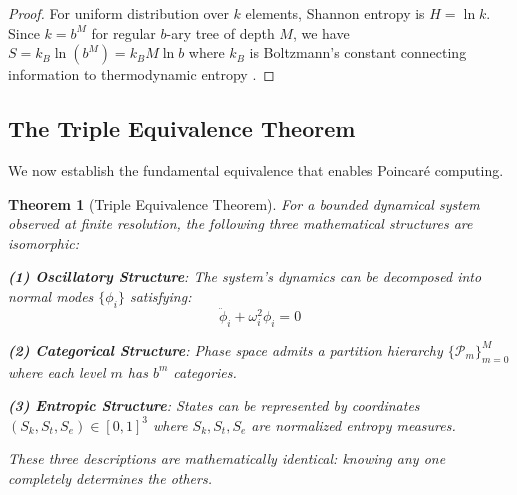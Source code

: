 \documentclass[twocolumn,10pt]{article}
\newtheorem{theorem}{Theorem}
\begin{document}
\begin{proof}
For uniform distribution over $k$ elements, Shannon entropy is $H = \ln k$. Since $k = b^M$ for regular $b$-ary tree of depth $M$, we have $S = k_B \ln(b^M) = k_B M \ln b$ where $k_B$ is Boltzmann's constant connecting information to thermodynamic entropy \cite{Shannon1948,Landauer1961}.
\end{proof}

\subsection{The Triple Equivalence Theorem}

We now establish the fundamental equivalence that enables Poincaré computing.

\begin{theorem}[Triple Equivalence Theorem]
\label{thm:triple_equivalence}
For a bounded dynamical system observed at finite resolution, the following three mathematical structures are isomorphic:

\textbf{(1) Oscillatory Structure}: The system's dynamics can be decomposed into normal modes $\{\phi_i\}$ satisfying:
\begin{equation}
\ddot{\phi}_i + \omega_i^2 \phi_i = 0
\end{equation}

\textbf{(2) Categorical Structure}: Phase space admits a partition hierarchy $\{\mathcal{P}_m\}_{m=0}^M$ where each level $m$ has $b^m$ categories.

\textbf{(3) Entropic Structure}: States can be represented by coordinates $(S_k, S_t, S_e) \in [0,1]^3$ where $S_k, S_t, S_e$ are normalized entropy measures.

These three descriptions are mathematically identical: knowing any one completely determines the others.
\end{theorem}
\end{document}
